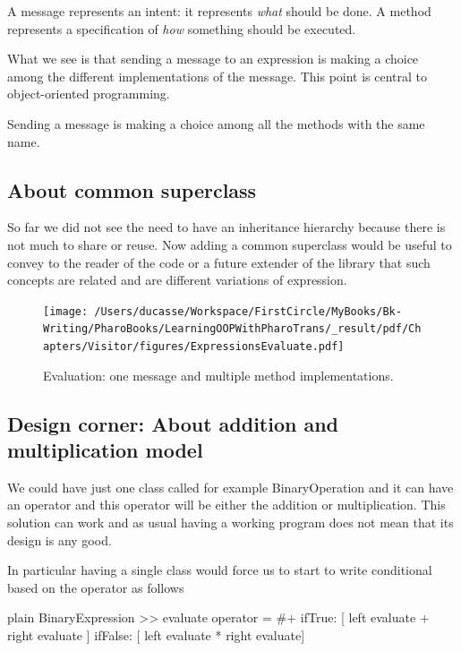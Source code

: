 \documentclass[10pt,twoside,english]{_support/latex/sbabook/sbabook}
\begin{document}
\begin{important}
A message represents an intent: it represents \textit{what} should be done. A method represents a specification of \textit{how} something should be executed. 
\end{important}

What we see is that sending a message  to an expression is making a choice among the different implementations of the message. This point is central to object-oriented programming. 

\begin{important}
Sending a message is making a choice among all the methods with the same name. 
\end{important}
\subsection{About common superclass}
So far we did not see the need to have an inheritance hierarchy because there is not much to share or reuse. Now adding a common superclass would be useful to convey to the reader of the code or a future extender of the library that such concepts are related and are different variations of expression. 


\begin{figure}

\begin{center}
\texttt{[image: /Users/ducasse/Workspace/FirstCircle/MyBooks/Bk-Writing/PharoBooks/LearningOOPWithPharoTrans/\_result/pdf/Chapters/Visitor/figures/ExpressionsEvaluate.pdf]}\caption{Evaluation: one message and multiple method implementations.\label{figExpressionEvaluate}}\end{center}
\end{figure}

\subsection{Design corner: About addition and multiplication model }
We could have just one class called for example BinaryOperation and it can have an operator and this operator will be either 
the addition or multiplication. This solution can work and as usual having a working program does not mean that its design is any good. 

In particular having a single class would force us to start to write conditional based on the operator as follows

\begin{displaycode}{plain}
BinaryExpression >> evaluate
	operator = #+ 
		ifTrue: [ left evaluate + right evaluate ] 
		ifFalse: [ left evaluate * right evaluate]
\end{displaycode}
\end{document}
